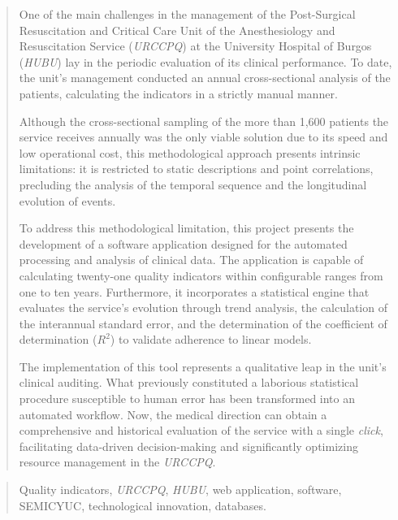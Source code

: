 \documentclass[a4paper,12pt,twoside]{memoir}
\begin{document}
\clearpage

\renewcommand*\abstractname{Abstract}
\begin{abstract}
One of the main challenges in the management of the Post-Surgical Resuscitation and Critical Care Unit of the Anesthesiology and Resuscitation Service (\textit{URCCPQ}) at the University Hospital of Burgos (\textit{HUBU}) lay in the periodic evaluation of its clinical performance. To date, the unit's management conducted an annual cross-sectional analysis of the patients, calculating the indicators in a strictly manual manner. 

Although the cross-sectional sampling of the more than 1,600 patients the service receives annually was the only viable solution due to its speed and low operational cost, this methodological approach presents intrinsic limitations: it is restricted to static descriptions and point correlations, precluding the analysis of the temporal sequence and the longitudinal evolution of events.

To address this methodological limitation, this project presents the development of a software application designed for the automated processing and analysis of clinical data. The application is capable of calculating twenty-one quality indicators within configurable ranges from one to ten years. Furthermore, it incorporates a statistical engine that evaluates the service's evolution through trend analysis, the calculation of the interannual standard error, and the determination of the coefficient of determination ($R^2$) to validate adherence to linear models.

The implementation of this tool represents a qualitative leap in the unit's clinical auditing. What previously constituted a laborious statistical procedure susceptible to human error has been transformed into an automated workflow. Now, the medical direction can obtain a comprehensive and historical evaluation of the service with a single \textit{click}, facilitating data-driven decision-making and significantly optimizing resource management in the \textit{URCCPQ}.
\end{abstract}

\renewcommand*\abstractname{Keywords}
\begin{abstract}
Quality indicators, \textit{URCCPQ}, \textit{HUBU}, web application, software, SEMICYUC, technological innovation, databases.
\end{abstract}

\clearpage

\tableofcontents

\clearpage

\listoffigures

\clearpage

\listoftables
\clearpage


\mainmatter












\end{document}
